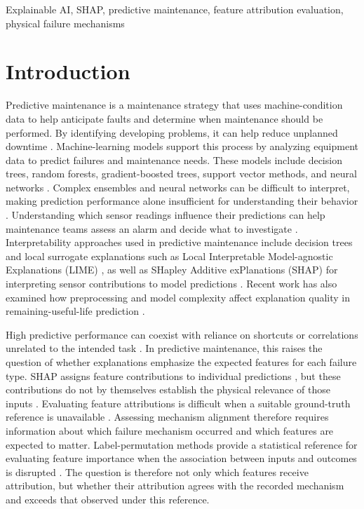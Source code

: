 \documentclass[conference]{IEEEtran}
\begin{document}
\begin{IEEEkeywords}
Explainable AI, SHAP, predictive maintenance, feature attribution evaluation,
physical failure mechanisms
\end{IEEEkeywords}

\section{Introduction}

Predictive maintenance is a maintenance strategy that uses machine-condition data to help anticipate faults and determine when maintenance should be performed. By identifying developing problems, it can help reduce unplanned downtime \cite{cummins2024survey}. Machine-learning models support this process by analyzing equipment data to predict failures and maintenance needs. These models include decision trees, random forests, gradient-boosted trees, support vector methods, and neural networks \cite{bukhsh2019predictive,jalali2020interpretability}. Complex ensembles and neural networks can be difficult to interpret, making prediction performance alone insufficient for understanding their behavior \cite{lundberg2017shap}. Understanding which sensor readings influence their predictions can help maintenance teams assess an alarm and decide what to investigate \cite{steurtewagen2021adding}. Interpretability approaches used in predictive maintenance include decision trees and local surrogate explanations such as Local Interpretable Model-agnostic Explanations (LIME) \cite{bukhsh2019predictive}, as well as SHapley Additive exPlanations (SHAP) for interpreting sensor contributions to model predictions \cite{steurtewagen2021adding,gawde2024explainable}. Recent work has also examined how preprocessing and model complexity affect explanation quality in remaining-useful-life prediction \cite{ndao2025improving}.

High predictive performance can coexist with reliance on shortcuts or correlations unrelated to the intended task \cite{geirhos2020shortcut,lapuschkin2019unmasking}. In predictive maintenance, this raises the question of whether explanations emphasize the expected features for each failure type. SHAP assigns feature contributions to individual predictions \cite{lundberg2017shap}, but these contributions do not by themselves establish the physical relevance of those inputs \cite{janzing2020feature}. Evaluating feature attributions is difficult when a suitable ground-truth reference is unavailable \cite{zhou2022attribute}. Assessing mechanism alignment therefore requires information about which failure mechanism occurred and which features are expected to matter. Label-permutation methods provide a statistical reference for evaluating feature importance when the association between inputs and outcomes is disrupted \cite{altmann2010permutation}. The question is therefore not only which features receive attribution, but whether their attribution agrees with the recorded mechanism and exceeds that observed under this reference.
\end{document}
